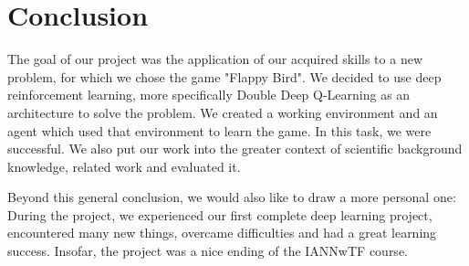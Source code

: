 \section{Conclusion}

The goal of our project was the application of our acquired skills to a new problem, for which we chose the game "Flappy Bird". We decided to use deep reinforcement learning, more specifically Double Deep Q-Learning as an architecture to solve the problem. We created a working environment and an agent which used that environment to learn the game. In this task, we were successful. We also put our work into the greater context of scientific background knowledge, related work and evaluated it.  

\par
Beyond this general conclusion, we would also like to draw a more personal one: During the project, we experienced our first complete deep learning project, encountered many new things, overcame difficulties and had a great learning success. Insofar, the project was a nice ending of the IANNwTF course. 
